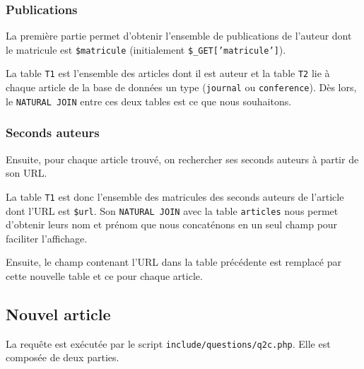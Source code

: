 \documentclass[a4paper, 12pt]{article}
\begin{document}
    \subsubsection{Publications}
    La première partie permet d'obtenir l'ensemble de publications de l'auteur dont le matricule est \texttt{\$matricule} (initialement \texttt{\$\_GET['matricule']}).
    
    La table \texttt{T1} est l'ensemble des articles dont il est auteur et la table \texttt{T2} lie à chaque article de la base de données un type (\texttt{journal} ou \texttt{conference}). Dès lors, le \texttt{NATURAL JOIN} entre ces deux tables est ce que nous souhaitons.
    \subsubsection{Seconds auteurs}
    Ensuite, pour chaque article trouvé, on rechercher ses seconds auteurs à partir de son URL. \newpage
    
    La table \texttt{T1} est donc l'ensemble des matricules des seconds auteurs de l'article dont l'URL est \texttt{\$url}. Son \texttt{NATURAL JOIN} avec la table \texttt{articles} nous permet d'obtenir leurs nom et prénom que nous concaténons en un seul champ pour faciliter l'affichage. \par
    Ensuite, le champ contenant l'URL dans la table précédente est remplacé par cette nouvelle table et ce pour chaque article.
    \subsection{Nouvel article}\label{sec:nouvel-article}
    La requête est exécutée par le script \texttt{include/questions/q2c.php}. Elle est composée de deux parties.
\end{document}

